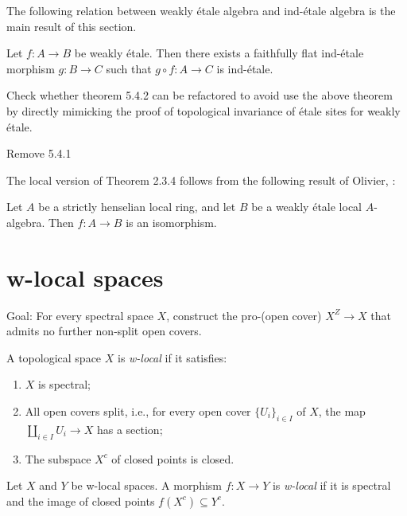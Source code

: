 The following relation between weakly étale algebra and ind-étale algebra is the main result of this section.
\begin{theorem}
Let $f: A \to B$ be weakly étale. Then there exists a faithfully flat ind-étale morphism $g: B \to C$ such that $g \circ f: A \to C$ is ind-étale.
    \label{thm:weakly-etale-ind-etale}
\end{theorem}

Check whether theorem 5.4.2 can be refactored to avoid use the above theorem by directly mimicking the proof of topological invariance of étale sites for weakly étale.

Remove 5.4.1



The local version of Theorem 2.3.4 follows from the following result of Olivier, \cite{Oli72}:

\begin{theorem}
Let $A$ be a strictly henselian local ring, and let $B$ be a weakly étale local $A$-algebra. Then $f: A \to B$ is an isomorphism.
    \label{thm:weakly-etale-local}
\end{theorem}


\section{w-local spaces}

Goal: For every spectral space \(X\), construct the pro-(open cover) \(X^Z \to X\) that admits no further non-split open covers.

\begin{definition}
    \label{def:w-local-space}
    \leanok

    A topological space \(X\) is \emph{w-local} if it satisfies:
    \begin{enumerate}
        \item \(X\) is spectral;
        \item All open covers split, i.e., for every open cover \(\{U_i\}_{i \in I}\) of \(X\), the map \(\coprod_{i \in I} U_i \to X\) has a section;
        \item The subspace \(X^c\) of closed points is closed.
    \end{enumerate}
\end{definition}

\begin{definition}
    Let \(X\) and \(Y\) be w-local spaces. A morphism \(f: X \to Y\) is \emph{w-local} if it is spectral and the image of closed points \(f(X^c) \subseteq Y^c\).
    \label{def:w-local-morphism}
    \leanok
\end{definition}

